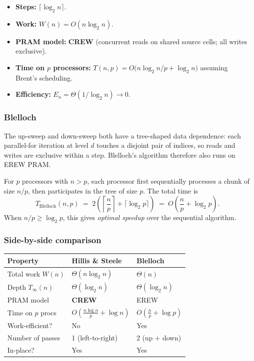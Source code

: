 \begin{itemize}[leftmargin=*]
  \item \textbf{Steps:} $\lceil \log_2 n \rceil$.
  \item \textbf{Work:} $W(n) = O(n \log_2 n)$.
  \item \textbf{PRAM model:} \textbf{CREW} (concurrent reads on shared
        source cells; all writes exclusive).
  \item \textbf{Time on $p$ processors:}
        $T(n,p) = O\bigl(n \log_2 n / p + \log_2 n\bigr)$ assuming
        Brent's scheduling.
  \item \textbf{Efficiency:} $E_n = \Theta(1/\log_2 n) \to 0$.
\end{itemize}

\subsubsection{Blelloch}
The up-sweep and down-sweep both have a tree-shaped data dependence:
each parallel-for iteration at level $d$ touches a disjoint pair of
indices, so reads and writes are exclusive within a step. Blelloch's
algorithm therefore also runs on EREW PRAM.

For $p$ processors with $n > p$, each processor first sequentially
processes a chunk of size $n/p$, then participates in the tree of size
$p$. The total time is
\[
T_{\mathrm{Blelloch}}(n, p) \;=\; 2\!\left(\left\lceil \frac{n}{p} \right\rceil
+ \lceil \log_2 p \rceil\right) \;=\; O\!\left(\frac{n}{p} + \log_2 p\right).
\]
When $n / p \ge \log_2 p$, this gives \emph{optimal speedup} over the
sequential algorithm.

\subsubsection{Side-by-side comparison}

\begin{center}
\begin{tabular}{lll}
\toprule
\textbf{Property} & \textbf{Hillis \& Steele} & \textbf{Blelloch} \\
\midrule
Total work $W(n)$    & $\Theta(n \log_2 n)$        & $\Theta(n)$ \\
Depth $T_\infty(n)$  & $\Theta(\log_2 n)$          & $\Theta(\log_2 n)$ \\
PRAM model           & \textbf{CREW}               & EREW \\
Time on $p$ procs    & $O\!\left(\frac{n \log n}{p} + \log n\right)$
                                                   & $O\!\left(\frac{n}{p} + \log p\right)$ \\
Work-efficient?      & No                          & Yes \\
Number of passes     & 1 (left-to-right)           & 2 (up + down) \\
In-place?            & Yes                         & Yes \\
\bottomrule
\end{tabular}
\end{center}

